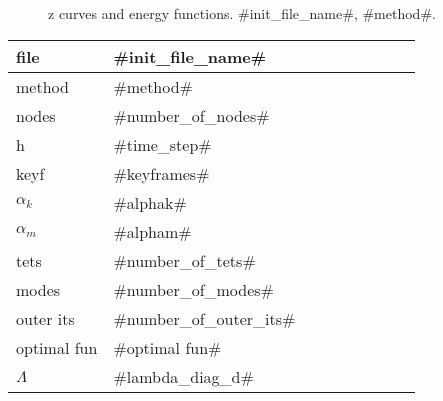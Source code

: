 

\begin{figure}
  \centering
  \caption{z curves and energy functions. #init_file_name#, #method#.}
  \label{en_f}
\end{figure}

\begin{center}
  \begin{tabular}{|l*{8}{|l}}
    \hline
	file & #init_file_name# \\ \hline
	method & #method# \\ \hline
	nodes & #number_of_nodes# \\ \hline
	h & #time_step# \\ \hline
    keyf & #keyframes#\\\hline
	$\alpha_k$ & #alphak# \\ \hline
	$\alpha_m$ & #alpham# \\ \hline
	tets & #number_of_tets# \\ \hline
	modes & #number_of_modes# \\ \hline
    outer its & #number_of_outer_its# \\ \hline
    optimal fun & #optimal fun# \\ \hline
	$\Lambda$ & #lambda_diag_d# 
  \end{tabular}
\end{center}